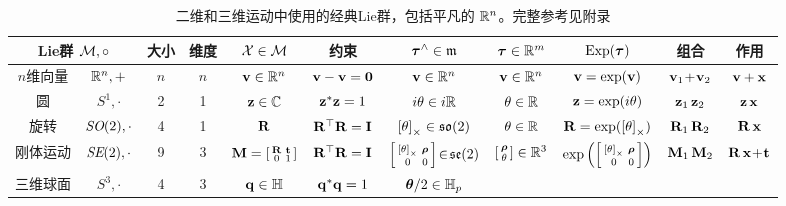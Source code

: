 
\begin{table*}[tb]
\caption{二维和三维运动中使用的经典Lie群，包括平凡的 ${\mathbb R}^n$。完整参考见附录 
}
\label{tab:manifolds}
\begin{center}
\begin{tabular}{|c|c|c|c|c|c|c|c|c|c|c|}
\multicolumn{2}{|c|}{Lie群 $\mathcal{M},\circ$} & \!大小\! & \!维度\! 
  & $\mathcal{X}\in\mathcal{M}$ 
  & 约束
  & ${\bm \tau}^\wedge\in\frak{m}$    
  & ${\bm \tau}\in{\mathbb R}^m$ 
  & $\operatorname*{Exp}({\bm \tau})$  
  & 组合
  & 作用
  \\
\toprule
$n$维向量  & ${\mathbb R}^n,+$ & $n$  & $n$ 
  & ${\bf v}\in{\mathbb R}^n$ 
  & ${\bf v}-{\bf v}=\bf0$
  & ${\bf v}\in{\mathbb R}^n$     
  & ${\bf v}\in{\mathbb R}^n$  
  & ${\bf v}=\exp({\bf v})$ 
  & ${\bf v}_1\!+\!{\bf v}_2$
  & ${\bf v} + {\bf x}$
  \\
\midrule
圆        & $S^1,\cdot$   & 2    & 1 
  & ${\bf z}\in{\mathbb C}$ 
  & ${\bf z}^*{\bf z}=1$
  & $i\theta\in i{\mathbb R}$  
  & $\theta\in{\mathbb R}$  
  & ${\bf z}=\exp(i\theta)$ 
  & ${\bf z}_1\,{\bf z}_2$
  & ${\bf z}\,{\bf x}$
  \\
旋转   & $\textit{SO}(2),\cdot$ & 4    & 1 
  & ${\bf R}$ 
  & ${\bf R}^{\top}{\bf R}={\bf I}$
  & $\left[\theta\right]_\times\in{\mathfrak {so}}(2)$     
  & $\theta\in{\mathbb R}$    
  & ${\bf R}=\exp(\left[\theta\right]_\times)$ 
  & ${\bf R}_1\,{\bf R}_2$
  & ${\bf R}\,{\bf x}$
  \\
刚体运动  
  & $\textit{SE}(2),\cdot$ & 9    & 3   
  & ${\bf M}=\begin{bsmallmatrix}{\bf R} & {\bf t} \\ 0 & 1\end{bsmallmatrix}$ 
  & ${\bf R}^{\top}{\bf R}={\bf I}$
  & $\begin{bsmallmatrix}\left[\theta\right]_\times & {\bm \rho} \\ 0 & 0 \end{bsmallmatrix} \!\in\!{\mathfrak {se}}(2)$     
  & $\begin{bsmallmatrix}{\bm \rho}\\ \theta\end{bsmallmatrix}\in{\mathbb R}^3$  
  & $\exp\left(\begin{bsmallmatrix}\left[\theta\right]_\times & {\bm \rho} \\ 0 & 0\end{bsmallmatrix}\right)$ 
  & ${\bf M}_1\,{\bf M}_2$
  & ${\bf R}\,{\bf x}\!+\!{\bf t}$
  \\
\midrule
三维球面      & $S^3,\cdot$ & 4    & 3   
  & ${\bf q}\in{\mathbb H}$ 
  & ${\bf q}^*{\bf q}=1$
  & ${{\bm \theta}}/2\in{\mathbb H}_p$  

\end{tabular}
\end{center}
\end{table*}
